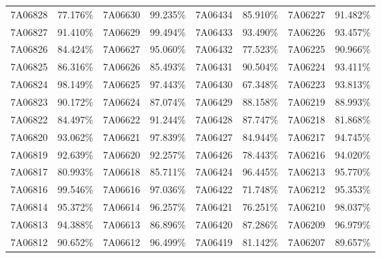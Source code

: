 \documentclass[12pt]{article}%
\begin{document}
\begin{longtable}{|cc|cc|cc|cc|}
7A06828              & 77.176\% & 7A06630              & 99.235\% & 7A06434              & 85.910\% & \multicolumn{1}{l}{7A06227             } & 91.482\% \\
7A06827              & 91.410\% & 7A06629              & 99.494\% & 7A06433              & 93.490\% & \multicolumn{1}{l}{7A06226             } & 93.457\% \\
7A06826              & 84.424\% & 7A06627              & 95.060\% & 7A06432              & 77.523\% & \multicolumn{1}{l}{7A06225             } & 90.966\% \\
7A06825              & 86.316\% & 7A06626              & 85.493\% & 7A06431              & 90.504\% & \multicolumn{1}{l}{7A06224             } & 93.411\% \\
7A06824              & 98.149\% & 7A06625              & 97.443\% & 7A06430              & 67.348\% & \multicolumn{1}{l}{7A06223             } & 93.813\% \\
7A06823              & 90.172\% & 7A06624              & 87.074\% & 7A06429              & 88.158\% & \multicolumn{1}{l}{7A06219             } & 88.993\% \\
7A06822              & 84.497\% & 7A06622              & 91.244\% & 7A06428              & 87.747\% & \multicolumn{1}{l}{7A06218             } & 81.868\% \\
7A06820              & 93.062\% & 7A06621              & 97.839\% & 7A06427              & 84.944\% & \multicolumn{1}{l}{7A06217             } & 94.745\% \\
7A06819              & 92.639\% & 7A06620              & 92.257\% & 7A06426              & 78.443\% & \multicolumn{1}{l}{7A06216             } & 94.020\% \\
7A06817              & 80.993\% & 7A06618              & 85.711\% & 7A06424              & 96.445\% & \multicolumn{1}{l}{7A06213             } & 95.770\% \\
7A06816              & 99.546\% & 7A06616              & 97.036\% & 7A06422              & 71.748\% & \multicolumn{1}{l}{7A06212             } & 95.353\% \\
7A06814              & 95.372\% & 7A06614              & 96.257\% & 7A06421              & 76.251\% & \multicolumn{1}{l}{7A06210             } & 98.037\% \\
7A06813              & 94.388\% & 7A06613              & 86.896\% & 7A06420              & 87.286\% & \multicolumn{1}{l}{7A06209             } & 96.979\% \\
7A06812              & 90.652\% & 7A06612              & 96.499\% & 7A06419              & 81.142\% & \multicolumn{1}{l}{7A06207             } & 89.657\% \\

\end{longtable}
\end{document}
